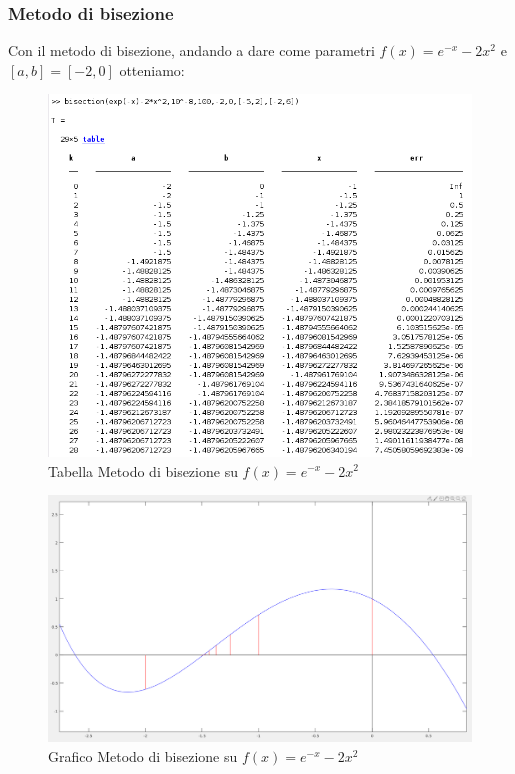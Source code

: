 \documentclass[12pt, letterpaper]{article}
\begin{document}
\subsubsection{Metodo di bisezione}
Con il metodo di bisezione, andando a dare come parametri $f(x)=e^{-x}-2x^2$ e $[a,b]=[-2,0]$ otteniamo:
\begin{figure}[ht!]
    \includegraphics[scale=0.63]{TabellaEsponenzialeBisezione.png}
    \caption{Tabella Metodo di bisezione su $f(x)=e^{-x}-2x^2$}
\end{figure}
\begin{figure}[ht!]
    \includegraphics[scale=0.4]{EsponenzialeBisezione.png}
    \caption{Grafico Metodo di bisezione su $f(x)=e^{-x}-2x^2$}
\end{figure} \\
\end{document}
